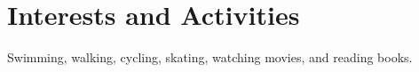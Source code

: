 \documentclass[a4paper, 11pt]{article}
\begin{document}
	\section{Interests and Activities}
	Swimming, walking, cycling, skating, watching movies, and reading books.
	
\end{document}
